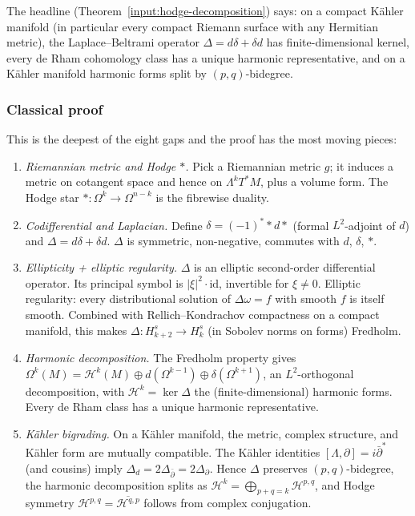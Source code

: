 The headline (Theorem~\ref{input:hodge-decomposition}) says: on a
compact K\"ahler manifold (in particular every compact Riemann surface
with any Hermitian metric), the Laplace--Beltrami operator
\(\Delta = d\delta + \delta d\) has finite-dimensional kernel, every
de Rham cohomology class has a unique harmonic representative, and on
a K\"ahler manifold harmonic forms split by \((p,q)\)-bidegree.

\subsubsection*{Classical proof}

This is the deepest of the eight gaps and the proof has the most
moving pieces:

\begin{enumerate}
\item \emph{Riemannian metric and Hodge \(*\).}  Pick a
  Riemannian metric \(g\); it induces a metric on cotangent space and
  hence on \(\Lambda^k T^* M\), plus a volume form.  The Hodge star
  \(* : \Omega^k \to \Omega^{n-k}\) is the fibrewise duality.
\item \emph{Codifferential and Laplacian.}  Define \(\delta = (-1)^* * d *\)
  (formal \(L^2\)-adjoint of \(d\)) and \(\Delta = d\delta + \delta d\).
  \(\Delta\) is symmetric, non-negative, commutes with \(d\),
  \(\delta\), \(*\).
\item \emph{Ellipticity + elliptic regularity.}  \(\Delta\) is an
  elliptic second-order differential operator.  Its principal
  symbol is \(|\xi|^2 \cdot \mathrm{id}\), invertible for
  \(\xi \neq 0\).  Elliptic regularity: every distributional
  solution of \(\Delta \omega = f\) with smooth \(f\) is itself
  smooth.  Combined with Rellich--Kondrachov compactness on a
  compact manifold, this makes \(\Delta : H^s_{k+2} \to H^s_k\) (in
  Sobolev norms on forms) Fredholm.
\item \emph{Harmonic decomposition.}  The Fredholm property gives
  \(\Omega^k(M) = \mathcal{H}^k(M) \oplus d(\Omega^{k-1}) \oplus \delta(\Omega^{k+1})\),
  an \(L^2\)-orthogonal decomposition, with
  \(\mathcal{H}^k = \ker \Delta\) the (finite-dimensional) harmonic
  forms.  Every de Rham class has a unique harmonic representative.
\item \emph{K\"ahler bigrading.}  On a K\"ahler manifold, the metric,
  complex structure, and K\"ahler form are mutually compatible.  The
  K\"ahler identities \([\Lambda, \partial] = i\bar\partial^*\) (and
  cousins) imply \(\Delta_d = 2\Delta_{\bar\partial} = 2\Delta_\partial\).
  Hence \(\Delta\) preserves \((p,q)\)-bidegree, the harmonic
  decomposition splits as
  \(\mathcal{H}^k = \bigoplus_{p+q=k} \mathcal{H}^{p,q}\), and Hodge
  symmetry \(\mathcal{H}^{p,q} = \overline{\mathcal{H}^{q,p}}\)
  follows from complex conjugation.
\end{enumerate}

